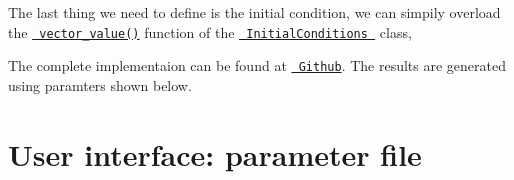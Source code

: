 The last thing we need to define is the initial condition, we can simpily overload the \href{../html/class_initial_conditions.html\#aa10cfdd7350c3810a8deab707f397657}{\texttt{ vector\+\_\+value()}} function of the \href{../html/class_initial_conditions.html}{\texttt{ Initial\+Conditions }} class, 
\begin{DoxyCode}{0}
\DoxyCodeLine{\}}
\end{DoxyCode}


The complete implementaion can be found at \href{https://github.com/mechanoChem/mechanoChemFEM/tree/example/Example4_growth}{\texttt{ Github}}. The results are generated using paramters shown below. \hypertarget{growth_file}{}\section{User interface\+: parameter file}\label{growth_file}

